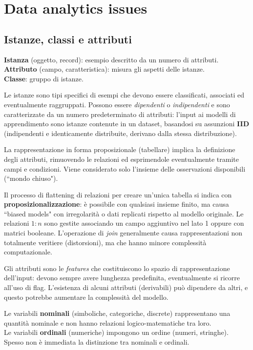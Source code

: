 \section{Data analytics issues}

\subsection{Istanze, classi e attributi}
\textbf{Istanza} (oggetto, record): esempio descritto da un numero di attributi. \\
\textbf{Attributo} (campo, caratteristica): misura gli aspetti delle istanze. \\
\textbf{Classe}: gruppo di istanze.

Le istanze sono tipi specifici di esempi che devono essere classificati, associati ed eventualmente raggruppati. Possono essere \textit{dipendenti} o \textit{indipendenti} e sono caratterizzate da un numero predeterminato di attributi: l'input ai modelli di apprendimento sono istanze contenute in un dataset, basandosi su assunzioni \textbf{IID} (indipendenti e identicamente distribuite, derivano dalla stessa distribuzione).

La rappresentazione in forma proposizionale (tabellare) implica la definizione degli attributi, rimuovendo le relazioni ed esprimendole eventualmente tramite campi e condizioni. Viene considerato solo l'insieme delle osservazioni disponibili (``mondo chiuso"). 

Il processo di flattening di relazioni per creare un'unica tabella si indica con \textbf{proposizionalizzazione}: è possibile con qualsiasi insieme finito, ma causa ``biased models" con irregolarità o dati replicati rispetto al modello originale. Le relazioni $1 : n$ sono gestite associando un campo aggiuntivo nel lato 1 oppure con matrici booleane. L'operazione di \textit{join} generalmente causa rappresentazioni non totalmente veritiere (distorsioni), ma che hanno minore complessità computazionale.

Gli attributi sono le \textit{features} che costituiscono lo spazio di rappresentazione dell'input: devono sempre avere lunghezza predefinita, eventualmente si ricorre all'uso di flag. L'esistenza di alcuni attributi (derivabili) può dipendere da altri, e questo potrebbe aumentare la complessità del modello. 

Le variabili \textbf{nominali} (simboliche, categoriche, discrete) rappresentano una quantità nominale e non hanno relazioni logico-matematiche tra loro. \\
Le variabili \textbf{ordinali} (numeriche) impongono un ordine (numeri, stringhe). \\
Spesso non è immediata la distinzione tra nominali e ordinali. 

